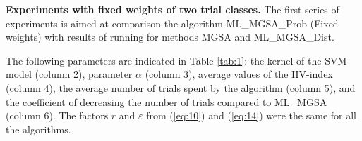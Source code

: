 \documentclass[runningheads]{llncs}
\begin{document}
\textbf{Experiments with fixed weights of two trial classes.} The first series of experiments is aimed at comparison the algorithm ML\_MGSA\_Prob (Fixed weights) with results of running for methods MGSA and ML\_MGSA\_Dist. 

The following parameters are indicated in Table \ref{tab:1}: the kernel of the SVM model (column 2), parameter $\alpha$ (column 3), average values of the HV-index (column 4), the average number of trials spent by the algorithm (column 5), and the coefficient of decreasing the number of trials compared to ML\_MGSA (column 6). The factors $r$ and $\varepsilon$ from (\ref{eq:10}) and (\ref{eq:14}) were the same for all the algorithms.

\begin{table}[ht]
\centering
\caption{Results of computational experiments}
\label{tab:1}
\end{table}
\end{document}
